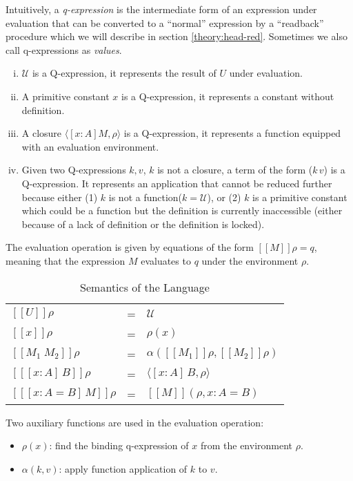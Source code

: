 Intuitively, a \emph{q-expression} is the intermediate form of an expression under evaluation that can be converted to a ``normal'' expression by a ``readback'' procedure which we will describe in section \ref{theory:head-red}. Sometimes we also call q-expressions as \emph{values}.
\begin{definition}[Q-expression]\label{theory:def:q-exp}
  \leavevmode \vspace{-\baselineskip}
  \begin{enumerate}[(i)]
    \item $\mathcal{U}$ is a Q-expression, it represents the result of $U$ under evaluation.
    \item A primitive constant $x$ is a Q-expression, it represents a constant without definition. 
    \item A closure $\langle [x : A] M, \rho \rangle$ is a Q-expression, it represents a function equipped with an evaluation environment.
    \item Given two Q-expressions $k,v$, $k$ is not a closure, a term of the form ($k\,v$) is a Q-expression. It represents an application that cannot be reduced further because either (1) $k$ is not a function($k = \mathcal{U}$), or (2) $k$ is a primitive constant which could be a function but the definition is currently inaccessible (either because of a lack of definition or the definition is locked).
  \end{enumerate}
\end{definition}

The evaluation operation is given by equations of the form $[\![M]\!]\rho = q$, meaning that the expression $M$ evaluates to $q$ under the environment $\rho$.
\begin{table}[h]
  \centering
  \begin{tabular}{l l l}
    $[\![U]\!]\rho$ & = & $\mathcal{U}$ \\
    $[\![x]\!]\rho$ & = & $\rho(x)$ \\
    $[\![M_1 \; M_2]\!]\rho$ & = & $\alpha([\![M_1]\!]\rho, [\![M_2]\!]\rho)$ \\
    $[\![[x : A]\,B]\!]\rho$ & = & $\langle[x : A]\,B, \rho\rangle$ \\
    $[\![[x : A = B]\,M]\!]\rho$ & = & $[\![M]\!](\rho, x : A = B)$ 
  \end{tabular}
  \caption{Semantics of the Language}
  \label{theory:tab:semantics}
\end{table}

Two auxiliary functions are used in the evaluation operation:
\begin{itemize}
\item $\rho(x)$: find the binding q-expression of $x$ from the environment $\rho$.
\item $\alpha(k, v)$: apply function application of $k$ to $v$. 
\end{itemize}

